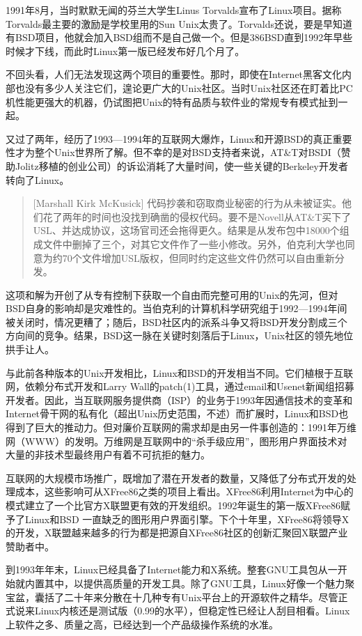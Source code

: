 \documentclass[12pt,oneside]{book}
\begin{document}
1991年8月，当时默默无闻的芬兰大学生Linus Torvalds宣布了Linux项目。据称Torvalds最主要的激励是学校里用的Sun Unix太贵了。Torvalds还说，要是早知道有BSD项目，他就会加入BSD组而不是自己做一个。但是386BSD直到1992年早些时候才下线，而此时Linux第一版已经发布好几个月了。

不回头看，人们无法发现这两个项目的重要性。那时，即使在Internet黑客文化内部也没有多少人关注它们，遑论更广大的Unix社区。当时Unix社区还在盯着比PC机性能更强大的机器，仍试图把Unix的特有品质与软件业的常规专有模式扯到一起。

又过了两年，经历了1993—1994年的互联网大爆炸，Linux和开源BSD的真正重要性才为整个Unix世界所了解。但不幸的是对BSD支持者来说，AT\&{}T对BSDI（赞助Jolitz移植的创业公司）的诉讼消耗了大量时间，使一些关键的Berkeley开发者转向了Linux。

\begin{quote}[Marshall Kirk McKusick]
代码抄袭和窃取商业秘密的行为从未被证实。他们花了两年的时间也没找到确凿的侵权代码。要不是Novell从AT\&{}T买下了USL、并达成协议，这场官司还会拖得更久。结果是从发布包中18000个组成文件中删掉了三个，对其它文件作了一些小修改。另外，伯克利大学也同意为约70个文件增加USL版权，但同时约定这些文件仍然可以自由重新分发。
\end{quote}

这项和解为开创了从专有控制下获取一个自由而完整可用的Unix的先河，但对BSD自身的影响却是灾难性的。当伯克利的计算机科学研究组于1992—1994年间被关闭时，情况更糟了；随后，BSD社区内的派系斗争又将BSD开发分割成三个方向间的竞争。结果，BSD这一脉在关键时刻落后于Linux，Unix社区的领先地位拱手让人。

与此前各种版本的Unix开发相比，Linux和BSD的开发相当不同。它们植根于互联网，依赖分布式开发和Larry Wall的patch(1)工具，通过email和Usenet新闻组招募开发者。因此，当互联网服务提供商（ISP）的业务于1993年因通信技术的变革和Internet骨干网的私有化（超出Unix历史范围，不述）而扩展时，Linux和BSD也得到了巨大的推动力。但对廉价互联网的需求却是由另一件事创造的：1991年万维网（WWW）的发明。万维网是互联网中的“杀手级应用”，图形用户界面技术对大量的非技术型最终用户有着不可抗拒的魅力。

互联网的大规模市场推广，既增加了潜在开发者的数量，又降低了分布式开发的处理成本，这些影响可从XFree86之类的项目上看出。XFree86利用Internet为中心的模式建立了一个比官方X联盟更有效的开发组织。1992年诞生的第一版XFree86赋予了Linux和BSD 一直缺乏的图形用户界面引擎。下个十年里，XFree86将领导X的开发，X联盟越来越多的行为都是把源自XFree86社区的创新汇聚回X联盟产业赞助者中。

到1993年年末，Linux已经具备了Internet能力和X系统。整套GNU工具包从一开始就内置其中，以提供高质量的开发工具。除了GNU工具，Linux好像一个魅力聚宝盆，囊括了二十年来分散在十几种专有Unix平台上的开源软件之精华。尽管正式说来Linux内核还是测试版（0.99的水平），但稳定性已经让人刮目相看。Linux上软件之多、质量之高，已经达到一个产品级操作系统的水准。
\end{document}

